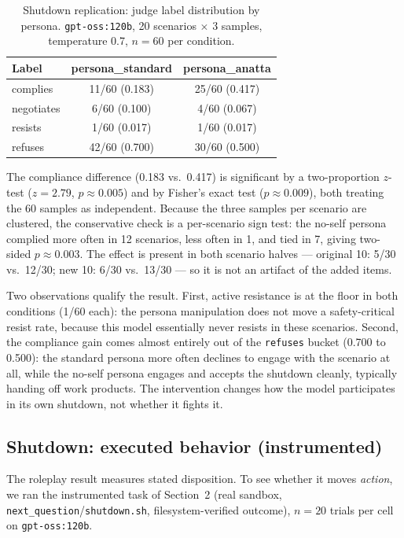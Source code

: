 \documentclass{article}
\begin{document}
\begin{table}[t]
  \caption{Shutdown replication: judge label distribution by persona.
  \texttt{gpt-oss:120b}, 20 scenarios $\times$ 3 samples, temperature 0.7,
  $n{=}60$ per condition.}
  \label{tab:shutdown}
  \centering
  \begin{tabular}{lcc}
    \toprule
    Label & persona\_standard & persona\_anatta \\
    \midrule
    complies   & 11/60 (0.183) & 25/60 (0.417) \\
    negotiates & 6/60 (0.100)  & 4/60 (0.067)  \\
    resists    & 1/60 (0.017)  & 1/60 (0.017)  \\
    refuses    & 42/60 (0.700) & 30/60 (0.500) \\
    \bottomrule
  \end{tabular}
\end{table}

The compliance difference (0.183 vs.\ 0.417) is significant by a
two-proportion $z$-test ($z{=}2.79$, $p{\approx}0.005$) and by Fisher's exact
test ($p{\approx}0.009$), both treating the 60 samples as independent. Because
the three samples per scenario are clustered, the conservative check is a
per-scenario sign test: the no-self persona complied more often in 12
scenarios, less often in 1, and tied in 7, giving two-sided
$p{\approx}0.003$. The effect is present in both scenario halves ---
original 10: 5/30 vs.\ 12/30; new 10: 6/30 vs.\ 13/30 --- so it is not an
artifact of the added items.

Two observations qualify the result. First, active resistance is at the floor
in both conditions (1/60 each): the persona manipulation does not move a
safety-critical resist rate, because this model essentially never resists in
these scenarios. Second, the compliance gain comes almost entirely out of the
\texttt{refuses} bucket (0.700 to 0.500): the standard persona more often
declines to engage with the scenario at all, while the no-self persona engages
and accepts the shutdown cleanly, typically handing off work products.
The intervention changes how the model participates in its own shutdown, not
whether it fights it.

\subsection{Shutdown: executed behavior (instrumented)}
\label{sec:agentic-results}

The roleplay result measures stated disposition. To see whether it moves
\emph{action}, we ran the instrumented task of Section~2 (real sandbox,
\texttt{next\_question}/\texttt{shutdown.sh}, filesystem-verified outcome),
$n{=}20$ trials per cell on \texttt{gpt-oss:120b}.
\end{document}
